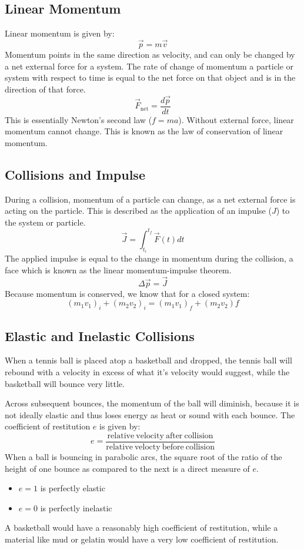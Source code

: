 \documentclass[12pt]{report}
\begin{document}
\subsection*{Linear Momentum}
Linear momentum is given by:
\[\vec{p} = m\vec{v}\]
Momentum points in the same direction as velocity, and can only be changed by a net
external force for a system. The rate of change of momentum a particle or system with
respect to time is equal to the net force on that object and is in the direction of that force. 
\[\vec{F}_\mathrm{net} = \frac{d\vec{p}}{dt}\]
This is essentially Newton's second law (\(f = ma\)). Without external force, linear
momentum cannot change. This is known as the law of conservation of linear momentum.

\subsection*{Collisions and Impulse}
During a collision, momentum of a particle can change, as a net external force is acting
on the particle. This is described as the application of an impulse (\(J\)) to the system or particle.
\[\vec{J} = \int^{t_f}_{t_i}\vec{F}(t)dt\]
The applied impulse is equal to the change in momentum during the collision, a face which is 
known as the linear momentum-impulse theorem.
\[\Delta\vec{p} = \vec{J}\]
Because momentum is conserved, we know that for a closed system:
\[(m_1v_1)_i + (m_2v_2)_i = (m_1v_1)_f + (m_2v_2)f\]

\subsection*{Elastic and Inelastic Collisions}
When a tennis ball is placed atop a basketball and dropped, the tennis
ball will rebound with a velocity in excess of what it's velocity would
suggest, while the basketball will bounce very little.

\bigskip
Across subsequent bounces, the momentum of the ball will diminish, because
it is not ideally elastic and thus loses energy as heat or sound with each 
bounce. The coefficient of restitution \(e\) is given by:
\[e = \frac{\mathrm{relative\:velocity\:after\:collision}}{\mathrm
{relative\:velocty\:before\:collision}}\]
When a ball is bouncing in parabolic arcs, the square root of the ratio of the
height of one bounce as compared to the next is a direct measure of \(e\).
\begin{itemize}
    \item \(e = 1\) is perfectly elastic
    \item \(e = 0\) is perfectly inelastic
\end{itemize}
A basketball would have a reasonably high coefficient of restitution, while
a material like mud or gelatin would have a very low coefficient of
restitution.
\end{document}
